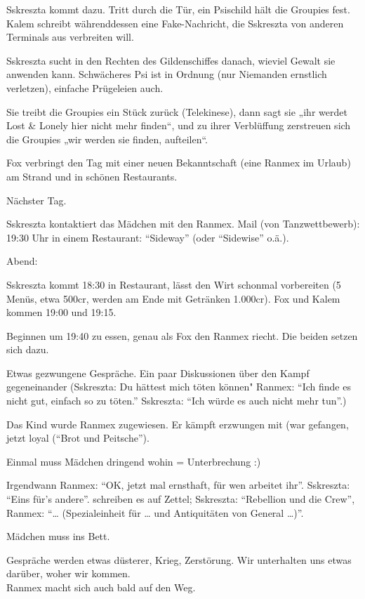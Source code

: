 \documentclass[11pt]{scrartcl}
\begin{document}
Sskreszta kommt dazu. Tritt durch die Tür, ein Psischild hält die
Groupies fest. Kalem schreibt währenddessen eine Fake-Nachricht, die
Sskreszta von anderen Terminals aus verbreiten will.

Sskreszta sucht in den Rechten des Gildenschiffes danach, wieviel Gewalt
sie anwenden kann. Schwächeres Psi ist in Ordnung (nur Niemanden
ernstlich verletzen), einfache Prügeleien auch.

Sie treibt die Groupies ein Stück zurück (Telekinese), dann sagt sie
„ihr werdet Lost \& Lonely hier nicht mehr finden``, und zu ihrer
Verblüffung zerstreuen sich die Groupies „wir werden sie finden,
aufteilen``.

Fox verbringt den Tag mit einer neuen Bekanntschaft (eine Ranmex im
Urlaub) am Strand und in schönen Restaurants.

Nächster Tag.

Sskreszta kontaktiert das Mädchen mit den Ranmex. Mail (von
Tanzwettbewerb): 19:30 Uhr in einem Restaurant: ``Sideway'' (oder
``Sidewise'' o.ä.).

Abend:

Sskreszta kommt 18:30 in Restaurant, lässt den Wirt schonmal vorbereiten
(5 Menüs, etwa 500cr, werden am Ende mit Getränken 1.000cr). Fox und
Kalem kommen 19:00 und 19:15.

Beginnen um 19:40 zu essen, genau als Fox den Ranmex riecht. Die beiden
setzen sich dazu.

Etwas gezwungene Gespräche. Ein paar Diskussionen über den Kampf
gegeneinander (Sskreszta: Du hättest mich töten können" Ranmex: ``Ich
finde es nicht gut, einfach so zu töten.'' Sskreszta: ``Ich würde es
auch nicht mehr tun''.)

Das Kind wurde Ranmex zugewiesen. Er kämpft erzwungen mit (war gefangen,
jetzt loyal (``Brot und Peitsche'').

Einmal muss Mädchen dringend wohin = Unterbrechung :)

Irgendwann Ranmex: ``OK, jetzt mal ernsthaft, für wen arbeitet ihr''.
Sskreszta: ``Eins für's andere''. schreiben es auf Zettel; Sskreszta:
``Rebellion und die Crew'', Ranmex: ``\ldots{} (Spezialeinheit für
\ldots{} und Antiquitäten von General \ldots{})''.

Mädchen muss ins Bett.

Gespräche werden etwas düsterer, Krieg, Zerstörung. Wir unterhalten uns
etwas darüber, woher wir kommen.\\ Ranmex macht sich auch bald auf den
Weg.
\end{document}
